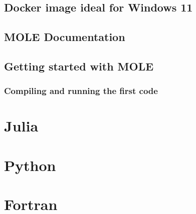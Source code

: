 \section{Docker image ideal for Windows 11}


\section{MOLE Documentation}

\section{Getting started with MOLE}

\subsection{Compiling and running the first code}

\chapter{Julia}

\chapter{Python}

\chapter{Fortran}

\nocite{*}
\printbibliography[title={References}]
